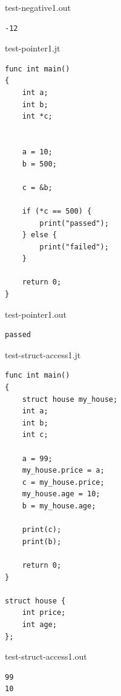 \documentclass{article}
\begin{document}
test-negative1.out
\begin{lstlisting}
-12
\end{lstlisting}

\newpage

test-pointer1.jt
\begin{lstlisting}
func int main()
{
	int a;
	int b;
	int *c;


	a = 10;
	b = 500;

	c = &b;

	if (*c == 500) {
		print("passed");
	} else {
		print("failed");
	}

	return 0;
}
\end{lstlisting}

test-pointer1.out
\begin{lstlisting}
passed
\end{lstlisting}

\newpage


test-struct-access1.jt
\begin{lstlisting}
func int main()
{
	struct house my_house;
	int a;
	int b;
	int c;
	
	a = 99;	
	my_house.price = a;
	c = my_house.price;
	my_house.age = 10;
	b = my_house.age;

	print(c);
	print(b);
	
	return 0;
}

struct house {
	int price;
	int age;
};
\end{lstlisting}

test-struct-access1.out
\begin{lstlisting}
99
10
\end{lstlisting}

\newpage
\end{document}
